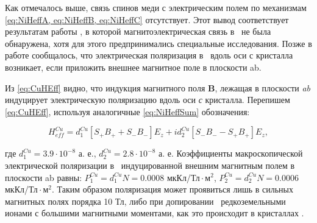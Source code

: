 Как отмечалось выше, связь спинов меди с электрическим полем по механизмам \cref{eq:NiHeffA, eq:NiHeffB, eq:NiHeffC} отсутствует. Этот вывод соответствует результатам работы \cite{Nenert2007}, в которой магнитоэлектрическая связь в \cbo\ не была обнаружена, хотя для этого предпринимались специальные исследования. Позже в работе \cite{Toyoda2016} сообщалось, что электрическая поляризация в \cbo\ вдоль оси с кристалла возникает, если приложить внешнее магнитное поле в плоскости ab. 

Из \cref{eq:CuHEff} видно, что индукция магнитного поля \textbf{B}, лежащая в плоскости \textit{ab} индуцирует электрическую поляризацию вдоль оси \textit{с} кристалла. Перепишем \cref{eq:CuHEff}, используя аналогичные \cref{eq:NiHeffSum} обозначения:

\begin{equation}
	\label{eq:CuHeffSum}
	H_{eff}^{Cu}=d_{1}^{Cu} \left[S_{+} B_{+}+S_{-} B_{-}\right] E_{z} + i d_{2}^{Cu}\left[S_{-} B_{-}-S_{+} B_{+}\right] E_{z},
\end{equation}

где $d_{1}^{Cu}=3.9\cdot10^{-8}$ а. е., $d_{2}^{Cu}=2.8\cdot10^{-8}$ а. е.
Коэффициенты макроскопической электрической поляризации в \cbo\, индуцированной внешним магнитным полем в плоскости ab равны: $P_{1}^{Cu}\mathop{=}d_{1}^{Cu}N\mathop{=}0.0008$ мкКл/Тл$\mathop{\cdot}$м$^{2}$, $P_{2}^{Cu}\mathop{=}d_{2}^{Cu}N\mathop{=}0.0006$ мкКл/Тл$\mathop{\cdot}$м$^{2}$.
Таким образом поляризация может проявиться лишь в сильных магнитных полях порядка 10 Тл, либо при допировании \cbo\  редкоземельными ионами с большими магнитными моментами, как это происходит в  кристаллах  \cite{Eremin2020}.

\FloatBarrier
